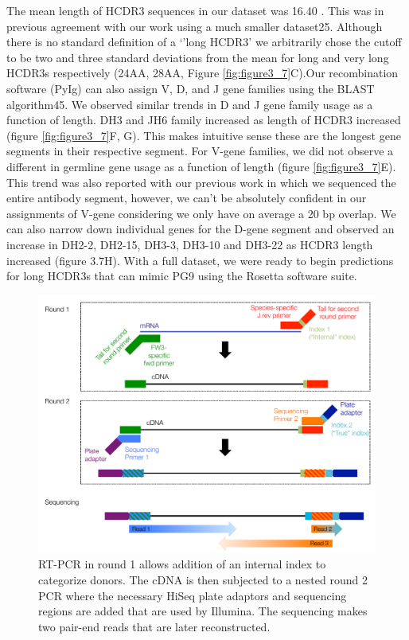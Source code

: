 The mean length of HCDR3 sequences in our dataset was 16.40 . This was in previous agreement with our work using a much smaller dataset25. Although there is no standard definition of a `'long HCDR3' we arbitrarily chose the cutoff to be two and three standard deviations from the mean for long and very long HCDR3s respectively (24AA, 28AA, Figure \ref{fig:figure3_7}C).Our recombination software (PyIg) can also assign V, D, and J gene families using the BLAST algorithm45. We observed similar trends in D and J gene family usage as a function of length. DH3 and JH6 family increased as length of HCDR3 increased (figure \ref{fig:figure3_7}F, G). This makes intuitive sense these are the longest gene segments in their respective segment. For V-gene families, we did not observe a different in germline gene usage as a function of length (figure \ref{fig:figure3_7}E). This trend was also reported with our previous work in which we sequenced the entire antibody segment, however, we can’t be absolutely confident in our assignments of V-gene considering we only have on average a 20 bp overlap. We can also narrow down individual genes for the D-gene segment and observed an increase in DH2-2, DH2-15, DH3-3, DH3-10 and DH3-22 as HCDR3 length increased (figure 3.7H).  With a full dataset, we were ready to begin predictions for long HCDR3s that can mimic PG9 using the Rosetta software suite.

\begin{figure}
   \centering
   \includegraphics[width=.9\linewidth]{images/chapter3/figure3_6.pdf} %
   \caption[Overview of HiSeq Scheme]{RT-PCR in round 1 allows addition of an internal index to categorize donors. The cDNA is then subjected to a nested round 2 PCR where the necessary HiSeq plate adaptors and sequencing regions are added that are used by Illumina. The sequencing makes two pair-end reads that are later reconstructed.}
   \label{fig:figure3_6}
\end{figure}

